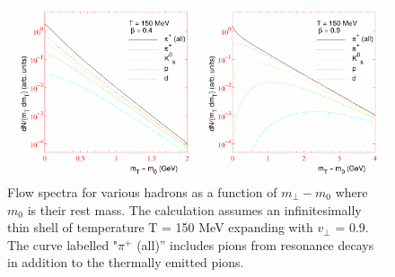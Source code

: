 \documentclass[12pt,a4paper]{book}
\begin{document}
	
	\begin{figure}[ht]
		\centering
		\includegraphics[width=0.8\linewidth]{pictures/flow_spectra.png}
		\caption{Flow spectra for various hadrons as a function of $m_\perp-m_0$ where $m_0$ is their rest mass. The calculation assumes an infinitesimally thin shell of temperature T = 150 MeV expanding with $v_\perp$ = 0.9. The curve labelled "$\pi^+$ (all)” includes pions from resonance decays in addition to the thermally emitted pions.}
		\label{fig:flow_spectra} 
	\end{figure}
	
\end{document}
